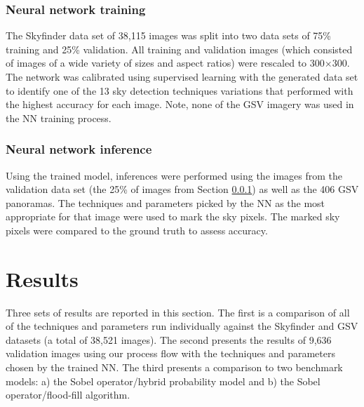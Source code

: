 \documentclass[final,3p,times,authoryear]{elsarticle}
\begin{document}
\subsubsection{Neural network training}\label{sec:nntraining}    

The Skyfinder data set of 38,115 images was split into two data sets of 75\% training and 25\% validation. All training and validation images (which consisted of images of a wide variety of sizes and aspect ratios) were rescaled to 300$\times$300. The network was calibrated using supervised learning with the generated data set to identify one of the 13 sky detection techniques variations that performed with the highest accuracy for each image. Note, none of the GSV imagery was used in the NN training process.





\subsubsection{Neural network inference}\label{sec:nninference}    
Using the trained model, inferences were performed using the images from the validation data set (the 25\% of images from Section \ref{sec:nntraining}) as well as the 406 GSV panoramas. The techniques and parameters picked by the NN as the most appropriate for that image were used to mark the sky pixels. The marked sky pixels were compared to the ground truth to assess accuracy.



\section{Results}\label{sec:results}


Three sets of results are reported in this section. The first is a comparison of all of the techniques and parameters run individually against the Skyfinder and GSV datasets (a total of 38,521 images). The second presents the results of 9,636  validation images using our process flow with the techniques and parameters chosen by the trained NN. The third presents a comparison to two benchmark models: a) the \cite{Wang2015a} Sobel operator/hybrid probability model and b) the \cite{Middel2018} Sobel operator/flood-fill algorithm.
\end{document}
